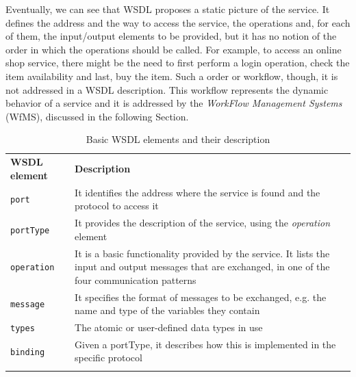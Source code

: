 Eventually, we can see that WSDL proposes a static picture of the service. It defines the address and the way to access the service, the operations and, for each of them, the input/output elements to be provided, but it has no notion of the order in which the operations should be called. For example, to access an online shop service, there might be the need to first perform a login operation, check the item availability and last, buy the item. Such a order or workflow, though, it is not addressed in a WSDL description. This workflow represents the dynamic behavior of a service and it is addressed by the \textit{WorkFlow Management Systems} (WfMS), discussed in the following Section.


% 
\begin{table}
\caption{Basic WSDL elements and their description}
\label{tab:WSDLElements}
\begin{center}
\begin{tabular}{l p{11cm}}

						\toprule
						\addlinespace[0.2cm]
\textbf{WSDL element} 	& \textbf{Description}	\\ 
						\cmidrule(l){1-2}
\verb|port| 		& It identifies the address where the service is found and the protocol to access it 				\\[0,1cm]
\verb|portType| 	& It provides the description of the service, using the \textit{operation} element 				\\[0,1cm]
\verb|operation| 	& It is a basic functionality provided by the service. It lists the input and output messages that are exchanged, in one of the four communication patterns 														\\[0,1cm]
\verb|message| 		& It specifies the format of messages to be exchanged, e.g. the name and type of the variables they contain 	\\[0,1cm]
\verb|types|		& The atomic or user-defined data types in use  								\\[0,1cm]
\verb|binding|		& Given a portType, it describes how this is implemented in the specific protocol 				\\[0,1cm]
	 
						\addlinespace[0.2cm]
						\bottomrule
\end{tabular}
\end{center}
\end{table}

